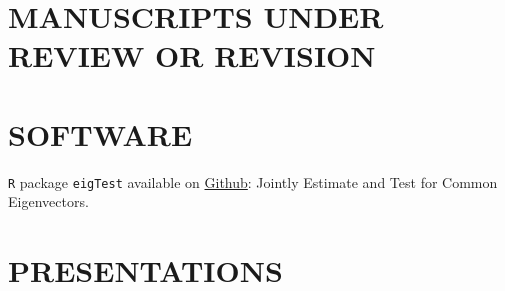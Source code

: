\documentclass[pdftex,11pt]{article}	%
\begin{document}
\vspace{.7em}
\printbibliography[heading=none, keyword=article]

\section*{MANUSCRIPTS UNDER REVIEW OR REVISION}
\vspace{.7em}
\printbibliography[heading=none, resetnumbers=true, keyword=submitted]
%

%

\section*{SOFTWARE}
\vspace{.7em}
\lstinline|R| package \lstinline|eigTest| available on \href{https://github.com/XycYuchenXu/eigTest}{Github}: Jointly Estimate and Test for Common Eigenvectors.

\section*{PRESENTATIONS}
\vspace{.7em}
%
\end{document}
